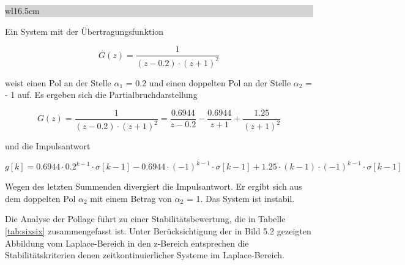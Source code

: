 \noindent
\colorbox{lightgray}{%
%
\renewcommand\arraystretch{0.6}%
\begin{tabular}{ wl{16.5cm} }
{}
\end{tabular}%
}\medskip

\noindent Ein System mit der \"{U}bertragungsfunktion 

\begin{equation}\label{eq:sixsonehundrednineteen}
G\left(z\right)=\frac{1}{\left(z-0.2\right)\cdot \left(z+1\right)^{2} }
\end{equation}

\noindent weist einen Pol an der Stelle $\alpha_{1}$ = 0.2 und einen doppelten Pol an der Stelle $\alpha_{2}$ = - 1 auf. Es ergeben sich die Partialbruchdarstellung

\begin{equation}\label{eq:sixsonehundredtwenty}
G\left(z\right)=\frac{1}{\left(z-0.2\right)\cdot \left(z+1\right)^{2}} =\frac{0.6944}{z-0.2} -\frac{0.6944}{z+1} +\frac{1.25}{\left(z+1\right)^{2}}
\end{equation}

\noindent und die Impulsantwort

\begin{equation}\label{eq:sixsonehundredtwentyone}
g\left[k\right]=0.6944\cdot 0.2^{k-1} \cdot \sigma \left[k-1\right]-0.6944\cdot \left(-1\right)^{k-1} \cdot \sigma \left[k-1\right]+1.25\cdot \left(k-1\right)\cdot \left(-1\right)^{k-1} \cdot \sigma \left[k-1\right]
\end{equation}

\noindent Wegen des letzten Summenden divergiert die Impulsantwort. Er ergibt sich aus dem doppelten Pol $\alpha_{2}$ mit einem Betrag von {\textbar}$\alpha_{2}${\textbar} = 1. Das System ist instabil.

\noindent Die Analyse der Pollage f\"{u}hrt zu einer Stabilit\"{a}tsbewertung, die in Tabelle \ref{tab:sixsix} zusammengefasst ist. Unter Ber\"{u}cksichtigung der in Bild 5.2 gezeigten Abbildung vom Laplace-Bereich in den z-Bereich entsprechen die Stabilit\"{a}tskriterien denen zeitkontinuierlicher Systeme im Laplace-Bereich.

